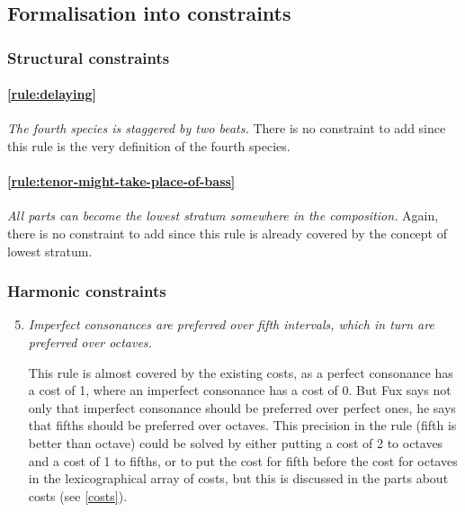 \subsection{Formalisation into constraints}\label{formalisation-c-4th}
\subsubsection{Structural constraints}
    \paragraph{\hspace{.5cm}\ref{rule:delaying}} \textit{The fourth species is staggered by two beats.}     
    There is no constraint to add since this rule is the very definition of the fourth species.

    \paragraph{\hspace{.5cm}\ref{rule:tenor-might-take-place-of-bass}} \textit{All parts can become the lowest stratum somewhere in the composition.} 
    Again, there is no constraint to add since this rule is already covered by the concept of lowest stratum.


\subsubsection{Harmonic constraints}
\begin{enumerate}[wide, label=\bfseries 4.H\arabic*]
    \setcounter{enumi}{4}
    \item \textit{Imperfect consonances are preferred over fifth intervals, which in turn are preferred over octaves.} \label{constraint:prefer-fifths-over-octaves}   

    This rule is almost covered by the existing costs, as a perfect consonance has a cost of 1, where an imperfect consonance has a cost of 0. But Fux says not only that imperfect consonance should be preferred over perfect ones, he says that fifths should be preferred over octaves. This precision in the rule (fifth is better than octave) could be solved by either putting a cost of 2 to octaves and a cost of 1 to fifths, or to put the cost for fifth before the cost for octaves in the lexicographical array of costs, but this is discussed in the parts about costs (see \ref{costs}).

\end{enumerate}

